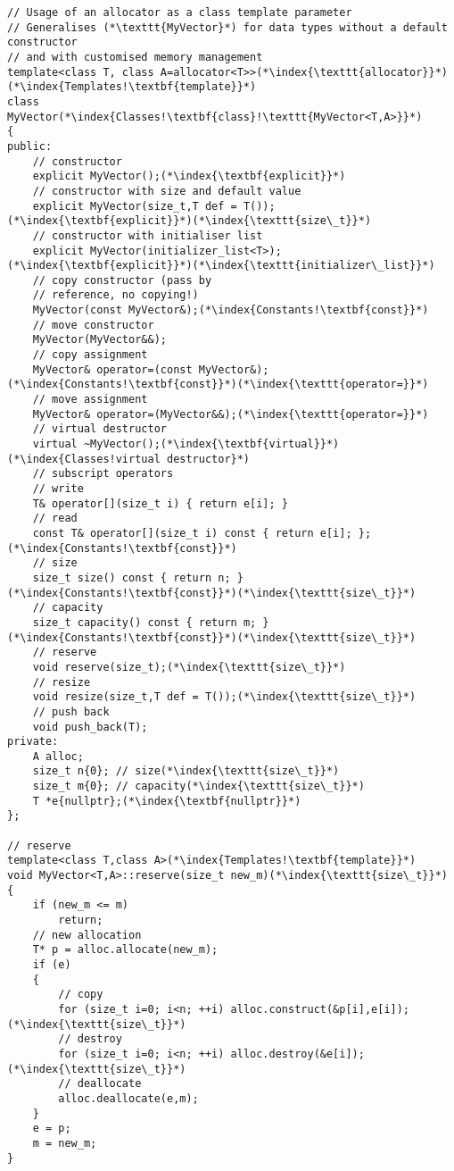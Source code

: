\documentclass[10pt]{article}
\begin{document}
\begin{lstlisting}
// Usage of an allocator as a class template parameter
// Generalises (*\texttt{MyVector}*) for data types without a default constructor
// and with customised memory management
template<class T, class A=allocator<T>>(*\index{\texttt{allocator}}*)(*\index{Templates!\textbf{template}}*)
class MyVector(*\index{Classes!\textbf{class}!\texttt{MyVector<T,A>}}*)
{
public:
    // constructor
    explicit MyVector();(*\index{\textbf{explicit}}*)
    // constructor with size and default value
    explicit MyVector(size_t,T def = T());(*\index{\textbf{explicit}}*)(*\index{\texttt{size\_t}}*)
    // constructor with initialiser list
    explicit MyVector(initializer_list<T>);(*\index{\textbf{explicit}}*)(*\index{\texttt{initializer\_list}}*)
    // copy constructor (pass by
    // reference, no copying!)
    MyVector(const MyVector&);(*\index{Constants!\textbf{const}}*)
    // move constructor
    MyVector(MyVector&&);
    // copy assignment
    MyVector& operator=(const MyVector&);(*\index{Constants!\textbf{const}}*)(*\index{\texttt{operator=}}*)
    // move assignment
    MyVector& operator=(MyVector&&);(*\index{\texttt{operator=}}*)
    // virtual destructor
    virtual ~MyVector();(*\index{\textbf{virtual}}*)(*\index{Classes!virtual destructor}*)
    // subscript operators
    // write
    T& operator[](size_t i) { return e[i]; }
    // read
    const T& operator[](size_t i) const { return e[i]; };(*\index{Constants!\textbf{const}}*)
    // size
    size_t size() const { return n; }(*\index{Constants!\textbf{const}}*)(*\index{\texttt{size\_t}}*)
    // capacity
    size_t capacity() const { return m; }(*\index{Constants!\textbf{const}}*)(*\index{\texttt{size\_t}}*)
    // reserve
    void reserve(size_t);(*\index{\texttt{size\_t}}*)
    // resize
    void resize(size_t,T def = T());(*\index{\texttt{size\_t}}*)
    // push back
    void push_back(T);
private:
    A alloc;
    size_t n{0}; // size(*\index{\texttt{size\_t}}*)
    size_t m{0}; // capacity(*\index{\texttt{size\_t}}*)
    T *e{nullptr};(*\index{\textbf{nullptr}}*)
};

// reserve
template<class T,class A>(*\index{Templates!\textbf{template}}*)
void MyVector<T,A>::reserve(size_t new_m)(*\index{\texttt{size\_t}}*)
{
    if (new_m <= m)
        return;
    // new allocation
    T* p = alloc.allocate(new_m);
    if (e)
    {
        // copy
        for (size_t i=0; i<n; ++i) alloc.construct(&p[i],e[i]);(*\index{\texttt{size\_t}}*)
        // destroy
        for (size_t i=0; i<n; ++i) alloc.destroy(&e[i]);(*\index{\texttt{size\_t}}*)
        // deallocate
        alloc.deallocate(e,m);
    }
    e = p;
    m = new_m;
}
\end{lstlisting}
\end{document}
